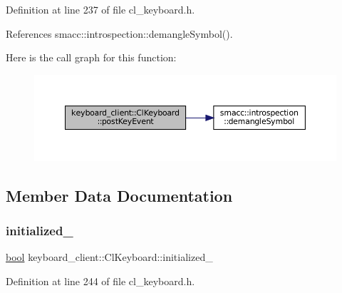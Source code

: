 Definition at line 237 of file cl\+\_\+keyboard.\+h.



References smacc\+::introspection\+::demangle\+Symbol().


Here is the call graph for this function\+:
\nopagebreak
\begin{figure}[H]
\begin{center}
\leavevmode
\includegraphics[width=350pt]{classkeyboard__client_1_1ClKeyboard_ad62d3548adfeca7f31469a283454dbeb_cgraph}
\end{center}
\end{figure}


\subsection{Member Data Documentation}
\mbox{\label{classkeyboard__client_1_1ClKeyboard_aff74d4f212f4846a1f7cc6c0e4d5f728}} 
\subsubsection{\texorpdfstring{initialized\+\_\+}{initialized\_}}
{\footnotesize\ttfamily \hyperlink{classbool}{bool} keyboard\+\_\+client\+::\+Cl\+Keyboard\+::initialized\+\_\+\hspace{0.3cm}{\ttfamily [private]}}



Definition at line 244 of file cl\+\_\+keyboard.\+h.



